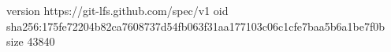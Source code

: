 version https://git-lfs.github.com/spec/v1
oid sha256:175fe72204b82ca7608737d54fb063f31aa177103c06c1cfe7baa5b6a1be7f0b
size 43840
